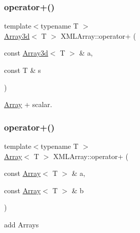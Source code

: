 \subsubsection{\texorpdfstring{operator+()}{operator+()}\hspace{0.1cm}{\footnotesize\ttfamily [3/6]}}
{\footnotesize\ttfamily template$<$typename T $>$ \\
\mbox{\hyperlink{classXMLArray_1_1Array3d}{Array3d}}$<$ T $>$ X\+M\+L\+Array\+::operator+ (\begin{DoxyParamCaption}\item[{const \mbox{\hyperlink{classXMLArray_1_1Array3d}{Array3d}}$<$ T $>$ \&}]{a,  }\item[{const T \&}]{s }\end{DoxyParamCaption})\hspace{0.3cm}{\ttfamily [inline]}}



\mbox{\hyperlink{classXMLArray_1_1Array}{Array}} + scalar. 

\mbox{\label{namespaceXMLArray_aaa831f7e352068ed72289b0dd0b9ec4d}} 
\subsubsection{\texorpdfstring{operator+()}{operator+()}\hspace{0.1cm}{\footnotesize\ttfamily [4/6]}}
{\footnotesize\ttfamily template$<$typename T $>$ \\
\mbox{\hyperlink{classXMLArray_1_1Array}{Array}}$<$ T $>$ X\+M\+L\+Array\+::operator+ (\begin{DoxyParamCaption}\item[{const \mbox{\hyperlink{classXMLArray_1_1Array}{Array}}$<$ T $>$ \&}]{a,  }\item[{const \mbox{\hyperlink{classXMLArray_1_1Array}{Array}}$<$ T $>$ \&}]{b }\end{DoxyParamCaption})\hspace{0.3cm}{\ttfamily [inline]}}



add Arrays 

\mbox{\label{namespaceXMLArray_a39a31427301b9eee1d81eafe77f67c47}} 
